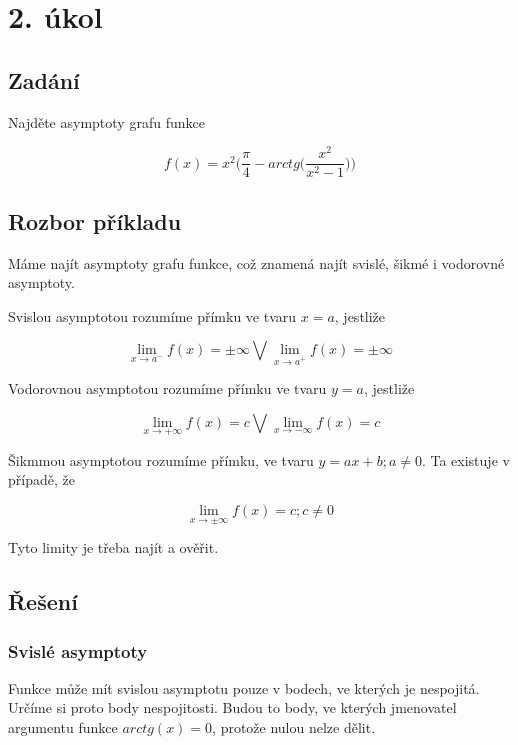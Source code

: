 \section{2. úkol}
\subsection{Zadání}

Najděte asymptoty grafu funkce 

\begin{displaymath}
f(x) = x^2\Big(\frac{\pi}{4}-arctg\Big(\frac{x^2}{x^2-1}\Big)\Big)
\end{displaymath}

\subsection{Rozbor příkladu}

Máme najít asymptoty grafu funkce, což znamená najít svislé, šikmé i vodorovné asymptoty.

Svislou asymptotou rozumíme přímku ve tvaru $x=a$, jestliže 

\begin{displaymath}
\lim_{x \to a^-} f(x) = \pm \infty \bigvee\lim_{x \to a^+} f(x) = \pm \infty
\end{displaymath}

Vodorovnou asymptotou rozumíme přímku ve tvaru $y=a$, jestliže

\begin{displaymath}
\lim_{x \to +\infty} f(x) = c \bigvee\lim_{x \to - \infty} f(x) = c
\end{displaymath}

Šikmmou asymptotou rozumíme přímku, ve tvaru $y=ax+b;a \neq 0$. Ta existuje v případě, že

\begin{displaymath}
\lim_{x \to \pm \infty} f(x) = c ;c \neq 0
\end{displaymath}

Tyto limity je třeba najít a ověřit.

\subsection{Řešení}

\subsubsection{Svislé asymptoty}
Funkce může mít svislou asymptotu pouze v bodech, ve kterých je nespojitá. Určíme si proto body nespojitosti. Budou to body, ve kterých jmenovatel argumentu funkce $arctg(x) = 0$, protože nulou nelze dělit.

